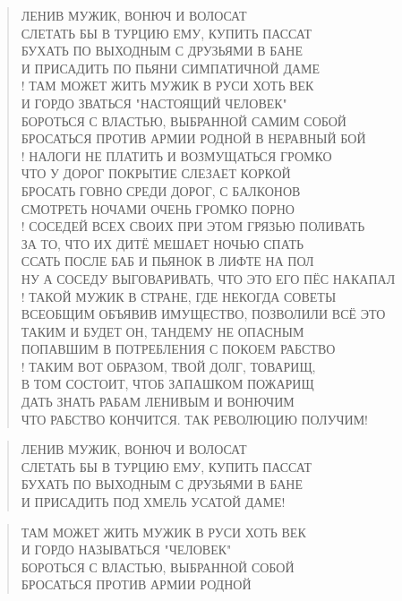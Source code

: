 \poemtitle{***}
\begin{verse}
ЛЕНИВ МУЖИК, ВОНЮЧ И ВОЛОСАТ\\
СЛЕТАТЬ БЫ В ТУРЦИЮ ЕМУ, КУПИТЬ ПАССАТ\\
БУХАТЬ ПО ВЫХОДНЫМ С ДРУЗЬЯМИ В БАНЕ\\
И ПРИСАДИТЬ ПО ПЬЯНИ СИМПАТИЧНОЙ ДАМЕ\\!
ТАМ МОЖЕТ ЖИТЬ МУЖИК В РУСИ ХОТЬ ВЕК\\
И ГОРДО ЗВАТЬСЯ "НАСТОЯЩИЙ ЧЕЛОВЕК"\\
БОРОТЬСЯ С ВЛАСТЬЮ, ВЫБРАННОЙ САМИМ СОБОЙ\\
БРОСАТЬСЯ ПРОТИВ АРМИИ РОДНОЙ В НЕРАВНЫЙ БОЙ\\!
НАЛОГИ НЕ ПЛАТИТЬ И ВОЗМУЩАТЬСЯ ГРОМКО\\
ЧТО У ДОРОГ ПОКРЫТИЕ СЛЕЗАЕТ КОРКОЙ\\
БРОСАТЬ ГОВНО СРЕДИ ДОРОГ, С БАЛКОНОВ\\
СМОТРЕТЬ НОЧАМИ ОЧЕНЬ ГРОМКО ПОРНО\\!
СОСЕДЕЙ ВСЕХ СВОИХ ПРИ ЭТОМ ГРЯЗЬЮ ПОЛИВАТЬ\\
ЗА ТО, ЧТО ИХ ДИТЁ МЕШАЕТ НОЧЬЮ СПАТЬ\\
ССАТЬ ПОСЛЕ БАБ И ПЬЯНОК В ЛИФТЕ НА ПОЛ\\
НУ А СОСЕДУ ВЫГОВАРИВАТЬ, ЧТО ЭТО ЕГО ПЁС НАКАПАЛ\\!
ТАКОЙ МУЖИК В СТРАНЕ, ГДЕ НЕКОГДА СОВЕТЫ\\
ВСЕОБЩИМ ОБЪЯВИВ ИМУЩЕСТВО, ПОЗВОЛИЛИ ВСЁ ЭТО\\
ТАКИМ И БУДЕТ ОН, ТАНДЕМУ НЕ ОПАСНЫМ\\
ПОПАВШИМ В ПОТРЕБЛЕНИЯ С ПОКОЕМ РАБСТВО\\!
ТАКИМ ВОТ ОБРАЗОМ, ТВОЙ ДОЛГ, ТОВАРИЩ,\\
В ТОМ СОСТОИТ, ЧТОБ ЗАПАШКОМ ПОЖАРИЩ\\
ДАТЬ ЗНАТЬ РАБАМ ЛЕНИВЫМ И ВОНЮЧИМ\\
ЧТО РАБСТВО КОНЧИТСЯ. ТАК РЕВОЛЮЦИЮ ПОЛУЧИМ!
\end{verse}

\poemtitle{***}
\begin{verse}
ЛЕНИВ МУЖИК, ВОНЮЧ И ВОЛОСАТ\\
СЛЕТАТЬ БЫ В ТУРЦИЮ ЕМУ, КУПИТЬ ПАССАТ\\
БУХАТЬ ПО ВЫХОДНЫМ С ДРУЗЬЯМИ В БАНЕ\\
И ПРИСАДИТЬ ПОД ХМЕЛЬ УСАТОЙ ДАМЕ!
\end{verse}

\poemtitle{***}
\begin{verse}
ТАМ МОЖЕТ ЖИТЬ МУЖИК В РУСИ ХОТЬ ВЕК\\
И ГОРДО НАЗЫВАТЬСЯ "ЧЕЛОВЕК"\\
БОРОТЬСЯ С ВЛАСТЬЮ, ВЫБРАННОЙ СОБОЙ\\
БРОСАТЬСЯ ПРОТИВ АРМИИ РОДНОЙ
\end{verse}

